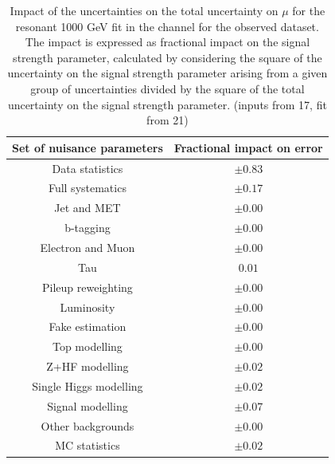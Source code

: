 \begin{table}
\centering
\begin{tabular}{|c|c|}
\hline
Set of nuisance parameters & Fractional impact on error\\
\hline
Data statistics & $\pm 0.83$\\
Full systematics & $\pm 0.17$\\
Jet and MET & $\pm 0.00$ \\
b-tagging & $\pm 0.00$\\
Electron and Muon & $\pm 0.00$\\
Tau & $0.01$\\
Pileup reweighting & $\pm 0.00$\\
Luminosity & $\pm 0.00$\\
Fake estimation & $\pm 0.00$\\
Top modelling & $\pm 0.00$\\ 
Z+HF modelling & $\pm 0.02$\\
Single Higgs modelling & $\pm 0.02$\\
Signal modelling & $\pm 0.07$\\
Other backgrounds & $\pm 0.00$\\
MC statistics & $\pm 0.02$\\
\hline
\end{tabular}
\caption{Impact of the uncertainties on the total uncertainty on $\mu$ for the resonant 1000 GeV fit in the \hadhad channel for the observed dataset.  The impact is expressed as fractional impact on the signal strength parameter,  calculated by considering the square of the uncertainty on the signal strength parameter arising from a given group of uncertainties divided by the square of the total uncertainty on the signal strength parameter.  (inputs from 17, fit from 21)}
\label{sec:fit:tab:HadHadBreakdown2HDM1000Observed}
\end{table}


